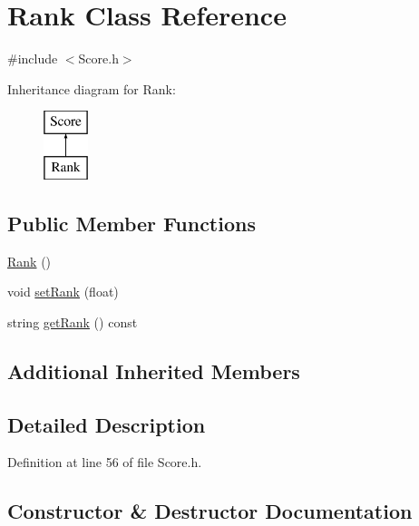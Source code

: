 \hypertarget{class_rank}{}\section{Rank Class Reference}
\label{class_rank}


{\ttfamily \#include $<$Score.\+h$>$}

Inheritance diagram for Rank\+:\begin{figure}[H]
\begin{center}
\leavevmode
\includegraphics[height=2.000000cm]{class_rank}
\end{center}
\end{figure}
\subsection*{Public Member Functions}
\begin{DoxyCompactItemize}
\item 
\hyperlink{class_rank_a49172e3a3cd9de174760c1d6a86db3f3}{Rank} ()
\item 
void \hyperlink{class_rank_ac844f437b5a6d913c649ae2f862db857}{set\+Rank} (float)
\item 
string \hyperlink{class_rank_ab51076f64f9ed558ab61f29283c630fc}{get\+Rank} () const
\end{DoxyCompactItemize}
\subsection*{Additional Inherited Members}


\subsection{Detailed Description}


Definition at line 56 of file Score.\+h.



\subsection{Constructor \& Destructor Documentation}
\hypertarget{class_rank_a49172e3a3cd9de174760c1d6a86db3f3}{}\label{class_rank_a49172e3a3cd9de174760c1d6a86db3f3} 
